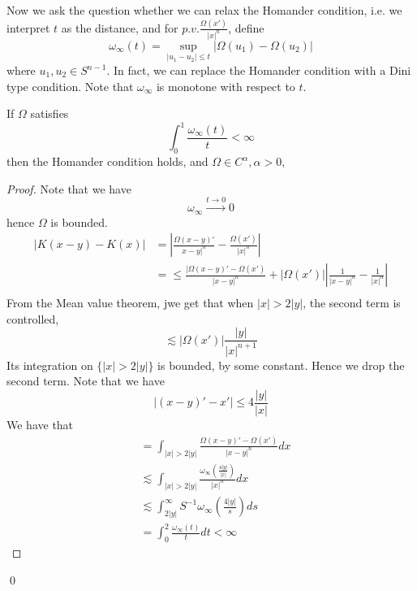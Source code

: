 Now we ask the question whether we can relax the Homander condition, i.e. we interpret $t$ as the distance, and for $p.v. \frac{\Omega(x')}{|x|^n}$, define
\begin{equation*}
    \omega_\infty(t)=\sup_{|u_1-u_2|\leq t}|\Omega(u_1)-\Omega(u_2)|
\end{equation*}
where $u_1, u_2\in S^{n-1}$. In fact, we can replace the Homander condition with a Dini type condition. Note that $\omega_\infty$ is monotone with respect to $t$.

\begin{proposition}
    If $\Omega$ satisfies 
    \begin{equation*}
        \int_0^1\frac{\omega_\infty(t)}{t}<\infty
    \end{equation*}
    then the Homander condition holds, and $\Omega\in C^\alpha, \alpha>0$, 
\end{proposition}
\begin{proof}
    Note that we have
    \begin{equation*}
        \omega_\infty\xrightarrow{t\to 0}0
    \end{equation*}
    hence $\Omega$ is bounded.
    \begin{align*}
        |K(x-y)-K(x)|&=\left|\frac{\Omega(x-y)'}{x-y|^n}-\frac{\Omega(x')}{|x|^n}\right|\\
        &=\leq \frac{|\Omega(x-y)'-\Omega(x')}{|x-y|^n}+|\Omega(x')|\left|\frac{1}{|x-y|^n}-\frac{1}{|x|^n}\right|\\
    \end{align*}
    From the Mean value theorem, jwe get that when $|x|>2|y|$, the second term is controlled,
    \begin{equation*}
        \lesssim |\Omega(x')|\frac{|y|}{|x|^{n+1}}
    \end{equation*}
    Its integration on $\{|x|>2|y|\}$ is bounded, by some constant. Hence we drop the second term. Note that we have
    \begin{equation*}
        |(x-y)'-x'|\leq 4\frac{|y|}{|x|}
    \end{equation*}
    We have that
    \begin{align*}
        &=\int_{|x|>2|y|}\frac{\Omega(x-y)'-\Omega(x')}{|x-y|^n}dx\\
        &\lesssim \int_{|x|>2|y|}\frac{\omega_\infty\left(\frac{4|y|}{|x|}\right)}{|x|^n}dx\\
        &\lesssim \int_{2|y|}^\infty S^{-1}\omega_\infty\left(\frac{4|y|}{s}\right)ds\\
        &=\int_0^2\frac{\omega_\infty(t)}{t}dt<\infty
    \end{align*}
\end{proof}
\qed

